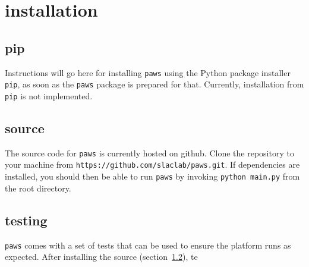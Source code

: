 \chapter{installation}
\label{ch:installation}

\section{pip}
\label{ch:pip_install}

Instructions will go here for installing \verb|paws| using 
the Python package installer \verb|pip|,
as soon as the \verb|paws| package is prepared for that.
Currently, installation from \verb|pip| is not implemented.


\section{source}
\label{sec:src_install}

The source code for \verb|paws| is currently hosted on github.
Clone the repository to your machine from \verb|https://github.com/slaclab/paws.git|.
If dependencies are installed, 
you should then be able to run \verb|paws| by invoking
\verb|python main.py| from the root directory.



\section{testing}
\label{sec:testing}

\verb|paws| comes with a set of tests that can be used 
to ensure the platform runs as expected.
After installing the source (section~\ref{sec:src_install}),
te


